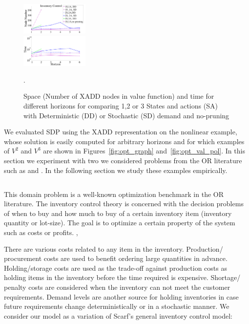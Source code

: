 \begin{figure}[tbp!]
\includegraphics[width=0.3\textwidth]{new_pics/space1.pdf}\\
\includegraphics[width=0.3\textwidth]{new_pics/time1.pdf}
\vspace{-2mm}
\caption{\footnotesize Space (Number of XADD nodes in value function) 
and time for different horizons for \InventoryControl comparing 
1,2 or 3 States and actions (SA) with Deterministic (DD) 
or Stochastic (SD) demand and no-pruning}.
\label{fig:invC}
\end{figure}

\label{sec:results}
 
We evaluated SDP using the XADD representation on the nonlinear
\MarsRover example, whose solution is easily computed for arbitrary
horizons and for which examples of $V^2$ and $V^3$ are shown in
Figures~\ref{fig:opt_graph} and~\ref{fig:opt_val_pol}.  In this
section we experiment with two we considered problems from the OR
literature such as \InventoryControl and \WaterReservoir. In the
following section we study these examples empirically.
 

\subsection{\InventoryControl}
This domain problem is a well-known optimization benchmark in the OR
literature. The inventory control theory is concerned with the decision problems of when to buy and how much to buy of a certain inventory item (inventory quantity or lot-size). The goal is to optimize a certain property of the system such as costs or profits. \cite{Scarf2002}, \cite{Scarf_Karlin58} 

There are various costs related to any item in the inventory. Production/ procurement costs are used to benefit ordering large quantities in advance. Holding/storage costs are used as the trade-off against production costs as holding items in the inventory before the time required is expensive. Shortage/ penalty costs are considered when the inventory can not meet the customer requirements. Demand levels are another source for holding inventories in case future requirements change deterministically or in a stochastic manner. 
We consider our model as a variation of Scarf's general inventory control model:
 
